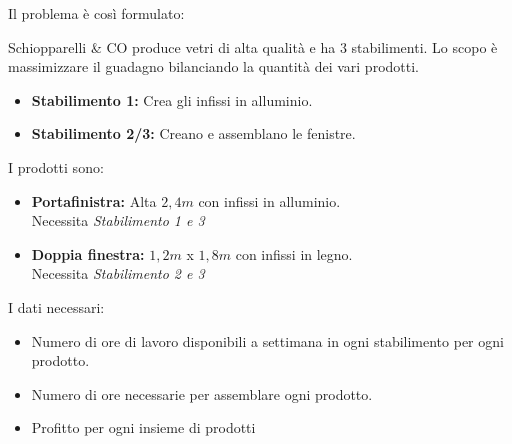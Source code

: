 \documentclass{article}
\begin{document}
Il problema è così formulato:
\begin{tcolorbox}[
    colback=lightgray,
    colframe=black,
    coltext=black,
    title=Problema di PL Schiopparelli \& Co,
    colbacktitle=black,
    coltitle=lightgray,
    breakable
  ]
  Schiopparelli \& CO produce vetri di alta qualità e ha $3$ stabilimenti. Lo scopo è massimizzare il guadagno bilanciando la quantità dei vari prodotti.
  \begin{itemize}
    \item \textbf{Stabilimento 1:} Crea gli infissi in alluminio.
    \item \textbf{Stabilimento 2/3:} Creano e assemblano le fenistre.
  \end{itemize}
  I prodotti sono:
  \begin{itemize}
    \item \textbf{Portafinistra:} Alta $2,4m$ con infissi in alluminio.\\  \hspace*{5mm} Necessita \textit{Stabilimento 1 e 3}
    \item \textbf{Doppia finestra:} $1,2m$ x $1,8m$ con infissi in legno.\\  \hspace*{5mm} Necessita \textit{Stabilimento 2 e 3}
  \end{itemize}
  I dati necessari:
  \begin{itemize}
    \item Numero di ore di lavoro disponibili a settimana in ogni stabilimento per ogni prodotto.
    \item Numero di ore necessarie per assemblare ogni prodotto.
    \item Profitto per ogni insieme di prodotti
  \end{itemize}


\end{tcolorbox}
\end{document}
